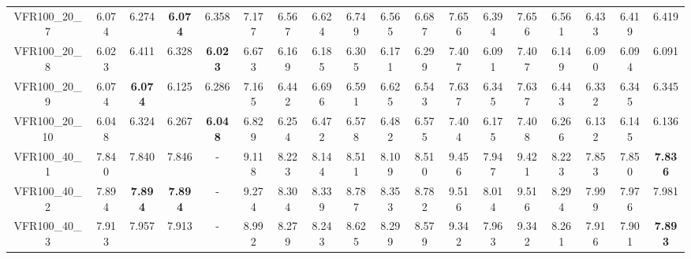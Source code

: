 \begin{tabular}{cc|ccc|ccccccccccccc}
VFR100\_20\_7      & 6.074            & 6.274            & {\bf 6.074}      & 6.358            & 7.177            & 6.567            & 6.624            & 6.749            & 6.565            & 6.687            & 7.656            & 6.394            & 7.656            & 6.561            & 6.433            & 6.419            & 6.419           \\ 
VFR100\_20\_8      & 6.023            & 6.411            & 6.328            & {\bf 6.023}      & 6.673            & 6.169            & 6.185            & 6.305            & 6.171            & 6.299            & 7.407            & 6.091            & 7.407            & 6.149            & 6.090            & 6.094            & 6.091           \\ 
VFR100\_20\_9      & 6.074            & {\bf 6.074}      & 6.125            & 6.286            & 7.165            & 6.442            & 6.696            & 6.591            & 6.625            & 6.543            & 7.637            & 6.345            & 7.637            & 6.443            & 6.332            & 6.345            & 6.345           \\ 
VFR100\_20\_10     & 6.048            & 6.324            & 6.267            & {\bf 6.048}      & 6.829            & 6.254            & 6.472            & 6.578            & 6.482            & 6.575            & 7.404            & 6.175            & 7.408            & 6.266            & 6.132            & 6.145            & 6.136           \\ 
VFR100\_40\_1      & 7.840            & 7.840            & 7.846            & -                & 9.118            & 8.223            & 8.144            & 8.511            & 8.109            & 8.510            & 9.456            & 7.947            & 9.421            & 8.223            & 7.853            & 7.850            & {\bf 7.836}     \\ 
VFR100\_40\_2      & 7.894            & {\bf 7.894}      & {\bf 7.894}      & -                & 9.274            & 8.304            & 8.339            & 8.787            & 8.353            & 8.782            & 9.516            & 8.014            & 9.516            & 8.294            & 7.999            & 7.976            & 7.981           \\ 
VFR100\_40\_3      & 7.913            & 7.957            & 7.913            & -                & 8.992            & 8.279            & 8.243            & 8.625            & 8.299            & 8.579            & 9.342            & 7.963            & 9.342            & 8.261            & 7.916            & 7.901            & {\bf 7.893}     \\ 

\end{tabular}
